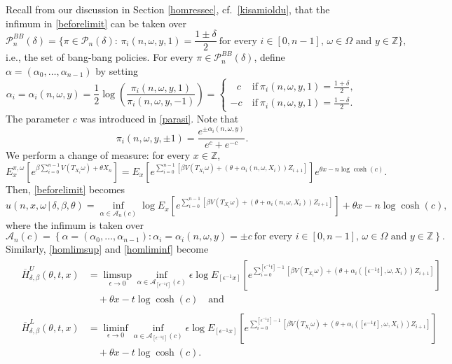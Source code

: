\documentclass[a4paper]{amsart}
\numberwithin{equation}{section}
\theoremstyle{plain}
\theoremstyle{remark}
\begin{document}
Recall from our discussion in Section \ref{homressec},
{}{cf.\ \eqref{kisamioldu}},
that the infimum in \eqref{beforelimit} can be taken over
$$\mathcal{P}_n^{BB}(\delta) = \{\pi\in\mathcal{P}_n(\delta):\,{\textstyle \pi_i(n,\omega,y,1) = \frac{1 \pm \delta}{2}}\ \text{for every $i\in[0,n-1]$, $\omega\in\Omega$ and $y\in\mathbb{Z}$}\},$$
i.e., the set of bang-bang policies. 
For every $\pi\in\mathcal{P}_n^{BB}(\delta)$, define $\alpha = (\alpha_0,\ldots,\alpha_{n-1})$ by setting
$$\alpha_i = \alpha_i(n,\omega,y) = \frac1{2}\log\left(\frac{\pi_i(n,\omega,y,1)}{\pi_i(n,\omega,y,-1)}\right) = \begin{cases}
\ \; \, c&\ \text{if}\ \pi_i(n,\omega,y,1) = \frac{1 + \delta}{2},\\
-c&\ \text{if}\ \pi_i(n,\omega,y,1) = \frac{1 - \delta}{2}.
\end{cases}$$
The parameter $c$ was introduced in \eqref{parasi}. Note that 
$$\pi_i(n,\omega,y,\pm1) = \frac{e^{\pm\alpha_i(n,\omega,y)}}{e^{c} + e^{-c}}.$$
{}{We}
perform a change of measure: for every $x\in\mathbb{Z}$,
$$E_x^{\pi,\omega}\left[e^{\beta\sum_{i=0}^{n-1} V(T_{X_i}\omega) + \theta X_n}\right] = E_x\left[e^{\sum_{i=0}^{n-1} [\beta V(T_{X_i}\omega) + (\theta + \alpha_i(n,\omega,X_i))Z_{i+1}]}\right]e^{\theta x - n\log\cosh(c)}.$$
Then, \eqref{beforelimit} becomes
\begin{equation}\label{dualform}
u(n,x,\omega\,|\,\delta,\beta,\theta) = \inf_{\alpha\in\mathcal{A}_n(c)}\log E_x\left[e^{\sum_{i=0}^{n-1} [\beta V(T_{X_i}\omega) + (\theta + \alpha_i(n,\omega,X_i))Z_{i+1}]}\right] + \theta x - n\log\cosh(c),
\end{equation}
where the infimum is taken over
\begin{equation}\label{eyensi}
\mathcal{A}_n(c) = \left\{\alpha = (\alpha_0,\ldots,\alpha_{n-1}):\alpha_i = \alpha_i(n,\omega,y) = \pm c\ \text{for every $i\in[0,n-1]$, $\omega\in\Omega$ and $y\in\mathbb{Z}$}\right\}.
\end{equation}
Similarly, \eqref{homlimsup} and \eqref{homliminf} become
\begin{align}
&\begin{aligned}\label{dualformsup}
\overline H_{\delta,\beta}^U(\theta,t,x) &= \limsup_{{\epsilon}\to0}\inf_{\alpha\in\mathcal{A}_{[{\epsilon^{-1}} t]}(c)}{\epsilon}\log E_{[{\epsilon^{-1}} x]}\left[e^{\sum_{i=0}^{[{\epsilon^{-1}} t]-1} [\beta V(T_{X_i}\omega) + (\theta + \alpha_i([{\epsilon^{-1}} t],\omega,X_i))Z_{i+1}]}\right]\\
&\quad + \theta x - t\log\cosh(c)\quad\text{and}
\end{aligned}\\
&\begin{aligned}\label{dualforminf}
\overline H_{\delta,\beta}^L(\theta,t,x) &= \liminf_{{\epsilon}\to0}\inf_{\alpha\in\mathcal{A}_{[{\epsilon^{-1}} t]}(c)}{\epsilon}\log E_{[{\epsilon^{-1}} x]}\left[e^{\sum_{i=0}^{[{\epsilon^{-1}} t]-1} [\beta V(T_{X_i}\omega) + (\theta + \alpha_i([{\epsilon^{-1}} t],\omega,X_i))Z_{i+1}]}\right]\\
&\quad + \theta x - t\log\cosh(c).
\end{aligned}
\end{align}
\end{document}
